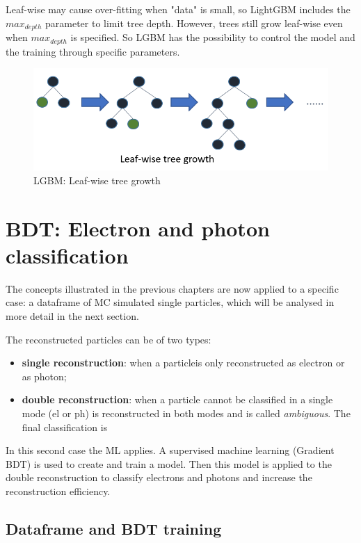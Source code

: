 \documentclass[a4paper, oneside]{book}
\begin{document}
		Leaf-wise may cause over-fitting when "data" is small, so LightGBM includes the $max_{depth}$ parameter to limit tree depth. However, trees still grow leaf-wise even when $max_{depth}$ is specified. So LGBM has the possibility to control the model and the training through specific parameters.
		\begin{figure}[H]
			\centering
			\includegraphics[width=0.35\textheight]{tesi_images/LGBM.png}
			\caption{LGBM: Leaf-wise tree growth}
			\label{fig:LGBM tree}
		\end{figure}
	
	\chapter{BDT: Electron and photon classification}	
		The concepts illustrated in the previous chapters are now applied to a specific case: a dataframe of MC simulated single particles, which will be analysed in more detail in the next section.
		
		The reconstructed particles can be of two types:
		\begin{itemize}
			\item \textbf{single reconstruction}: when a particleis only reconstructed as electron or as photon;
			\item \textbf{double reconstruction}: when a particle cannot be classified in a single mode (el or ph) is reconstructed in both modes and is called \textit{ambiguous}. The final classification is
		\end{itemize}
		
		In this second case the ML applies. A supervised machine learning (Gradient BDT) is used to create and train a model. Then this model is applied to the double reconstruction to classify electrons and photons and increase the reconstruction efficiency.
		
		\section{Dataframe and BDT training}
\end{document}
